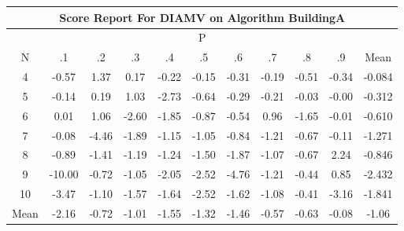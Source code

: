 \documentclass[11pt,a4paper]{report}
\begin{document}
\begin{longtable}{ | c || c | c | c | c | c | c | c | c | c || c |}
\hline
\multicolumn{11}{|c|}{ Score Report For DIAMV on Algorithm BuildingA} \\
\hline
\multicolumn{11}{|c|}{ P } \\
\hline
N & .1 & .2 & .3 & .4 & .5 & .6 & .7 & .8 & .9 & Mean\\
 \hline
 \hline
 \endhead
  4 &  \cellcolor[HTML]{FFEFEF} -0.57 &  \cellcolor[HTML]{DFDFFF} 1.37 &  \cellcolor[HTML]{F7F7FF} 0.17 &  \cellcolor[HTML]{FFF7F7} -0.22 &  \cellcolor[HTML]{FFFFFF} -0.15 &  \cellcolor[HTML]{FFF7F7} -0.31 &  \cellcolor[HTML]{FFF7F7} -0.19 &  \cellcolor[HTML]{FFEFEF} -0.51 &  \cellcolor[HTML]{FFF7F7} -0.34 & -0.084 \\
  5 &  \cellcolor[HTML]{FFFFFF} -0.14 &  \cellcolor[HTML]{F7F7FF} 0.19 &  \cellcolor[HTML]{E7E7FF} 1.03 &  \cellcolor[HTML]{FFB7B7} -2.73 &  \cellcolor[HTML]{FFEFEF} -0.64 &  \cellcolor[HTML]{FFF7F7} -0.29 &  \cellcolor[HTML]{FFF7F7} -0.21 &  \cellcolor[HTML]{FFFFFF} -0.03 &  \cellcolor[HTML]{FFFFFF} -0.00 & -0.312 \\
  6 &  \cellcolor[HTML]{FFFFFF} 0.01 &  \cellcolor[HTML]{E7E7FF} 1.06 &  \cellcolor[HTML]{FFBFBF} -2.60 &  \cellcolor[HTML]{FFCFCF} -1.85 &  \cellcolor[HTML]{FFE7E7} -0.87 &  \cellcolor[HTML]{FFEFEF} -0.54 &  \cellcolor[HTML]{E7E7FF} 0.96 &  \cellcolor[HTML]{FFD7D7} -1.65 &  \cellcolor[HTML]{FFFFFF} -0.01 & -0.610 \\
  7 &  \cellcolor[HTML]{FFFFFF} -0.08 &  \cellcolor[HTML]{FF8F8F} -4.46 &  \cellcolor[HTML]{FFCFCF} -1.89 &  \cellcolor[HTML]{FFDFDF} -1.15 &  \cellcolor[HTML]{FFE7E7} -1.05 &  \cellcolor[HTML]{FFE7E7} -0.84 &  \cellcolor[HTML]{FFDFDF} -1.21 &  \cellcolor[HTML]{FFEFEF} -0.67 &  \cellcolor[HTML]{FFFFFF} -0.11 & -1.271 \\
  8 &  \cellcolor[HTML]{FFE7E7} -0.89 &  \cellcolor[HTML]{FFDFDF} -1.41 &  \cellcolor[HTML]{FFDFDF} -1.19 &  \cellcolor[HTML]{FFDFDF} -1.24 &  \cellcolor[HTML]{FFD7D7} -1.50 &  \cellcolor[HTML]{FFCFCF} -1.87 &  \cellcolor[HTML]{FFE7E7} -1.07 &  \cellcolor[HTML]{FFEFEF} -0.67 &  \cellcolor[HTML]{C7C7FF} 2.24 & -0.846 \\
  9 &  \cellcolor[HTML]{FF0000} -10.00 &  \cellcolor[HTML]{FFEFEF} -0.72 &  \cellcolor[HTML]{FFE7E7} -1.05 &  \cellcolor[HTML]{FFCFCF} -2.05 &  \cellcolor[HTML]{FFBFBF} -2.52 &  \cellcolor[HTML]{FF8787} -4.76 &  \cellcolor[HTML]{FFDFDF} -1.21 &  \cellcolor[HTML]{FFF7F7} -0.44 &  \cellcolor[HTML]{E7E7FF} 0.85 & -2.432 \\
  10 &  \cellcolor[HTML]{FFA7A7} -3.47 &  \cellcolor[HTML]{FFE7E7} -1.10 &  \cellcolor[HTML]{FFD7D7} -1.57 &  \cellcolor[HTML]{FFD7D7} -1.64 &  \cellcolor[HTML]{FFBFBF} -2.52 &  \cellcolor[HTML]{FFD7D7} -1.62 &  \cellcolor[HTML]{FFE7E7} -1.08 &  \cellcolor[HTML]{FFF7F7} -0.41 &  \cellcolor[HTML]{FFAFAF} -3.16 & -1.841 \\
 \hline
 \hline
Mean &  \cellcolor[HTML]{FFC7C7} -2.16 &  \cellcolor[HTML]{FFEFEF} -0.72 &  \cellcolor[HTML]{FFE7E7} -1.01 &  \cellcolor[HTML]{FFD7D7} -1.55 &  \cellcolor[HTML]{FFDFDF} -1.32 &  \cellcolor[HTML]{FFD7D7} -1.46 &  \cellcolor[HTML]{FFEFEF} -0.57 &  \cellcolor[HTML]{FFEFEF} -0.63 &  \cellcolor[HTML]{FFFFFF} -0.08 &  \cellcolor[HTML]{FFE7E7} -1.06
\end{longtable}
\end{document}
